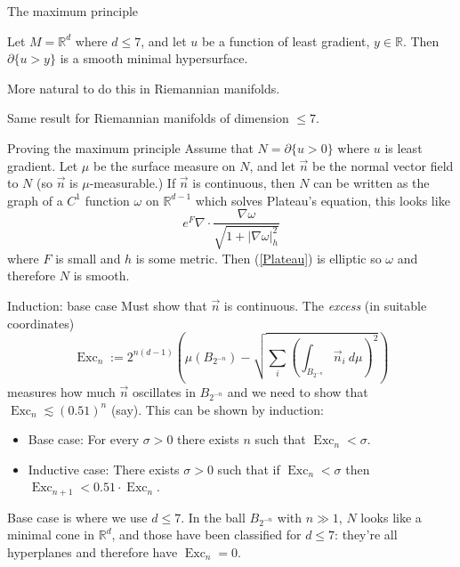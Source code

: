 \documentclass[10pt]{beamer}
\newcommand{\RR}{\mathbb{R}}
\DeclareMathOperator{\Exc}{Exc}
\newcommand{\normal}{\vec n}
\begin{document}
\begin{frame}{The maximum principle}
\begin{theorem}
Let $M = \RR^d$ where $d \leq 7$, and let $u$ be a function of least gradient, $y \in \RR$. Then $\partial \{u > y\}$ is a smooth minimal hypersurface.
\end{theorem}
\pause
More natural to do this in Riemannian manifolds.
\begin{theorem}[B., in preparation]
Same result for Riemannian manifolds of dimension $\leq 7$.
\end{theorem}
\end{frame}

\begin{frame}{Proving the maximum principle}
Assume that $N = \partial \{u > 0\}$ where $u$ is least gradient.
Let $\mu$ be the surface measure on $N$, and let $\normal$ be the normal vector field to $N$ (so $\normal$ is $\mu$-measurable.) \pause If $\normal$ is continuous, then $N$ can be written as the graph of a $C^1$ function $\omega$ on $\RR^{d - 1}$ which solves Plateau's equation, this looks like
\begin{equation}\label{Plateau}
e^F \nabla \cdot \frac{\nabla \omega}{\sqrt{1 + |\nabla \omega|^2_h}}
\end{equation}
where $F$ is small and $h$ is some metric. Then (\ref{Plateau}) is elliptic so $\omega$ and therefore $N$ is smooth.
\end{frame}

\begin{frame}{Induction: base case}
Must show that $\normal$ is continuous. The \emph{excess} (in suitable coordinates)
$$\Exc_n := 2^{n(d - 1)} \left(\mu(B_{2^{-n}}) - \sqrt{\sum_i\left(\int_{B_{2^{-n}}} \normal_i ~d\mu\right)^2} \right)$$
measures how much $\normal$ oscillates in $B_{2^{-n}}$ and we need to show that $\Exc_n \lesssim (0.51)^n$ (say). This can be shown by induction:\pause
\begin{itemize}
\item Base case: For every $\sigma > 0$ there exists $n$ such that $\Exc_n < \sigma$.\pause
\item Inductive case: There exists $\sigma > 0$ such that if $\Exc_n < \sigma$ then $\Exc_{n + 1} < 0.51 \cdot \Exc_n$.\pause
\end{itemize}
Base case is where we use $d \leq 7$. In the ball $B_{2^{-n}}$ with $n \gg 1$, $N$ looks like a minimal cone in $\RR^d$, and those have been classified for $d \leq 7$: they're all hyperplanes and therefore have $\Exc_n = 0$.
\end{frame}
\end{document}
